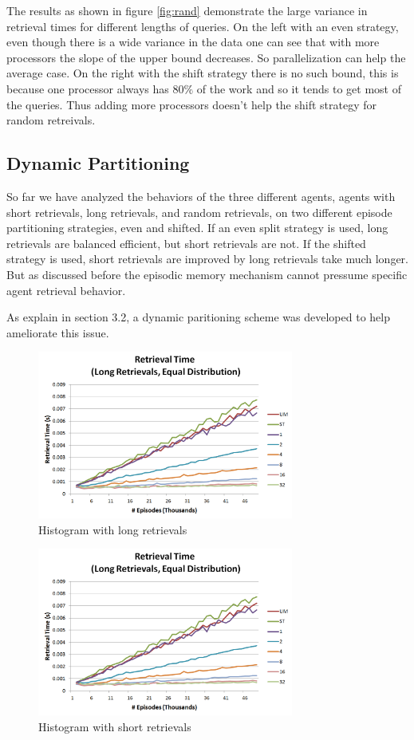 \documentclass[11pt]{article} %
\begin{document}
The results as shown in figure \ref{fig:rand} demonstrate the large variance in retrieval times for different lengths of queries.
On the left with an even strategy, even though there is a wide variance in the data one can see that with more processors the slope of the upper bound
decreases. So parallelization can help the average case. On the right with the shift strategy there is no such bound, 
this is because one processor always has $80\%$ of the work and so it tends to get most of the queries. Thus
adding more processors doesn't help the shift strategy for random retreivals. 



\subsection{Dynamic Partitioning}

So far we have analyzed the behaviors of the three different agents, agents with short retrievals, long retrievals, and random retrievals, on two different episode partitioning strategies, even and shifted.  If an even split strategy is used, long retrievals are balanced efficient, but short retrievals are not.  If the shifted strategy is used, short retrievals are improved by long retrievals take much longer. But as discussed before the episodic memory mechanism cannot pressume specific agent retrieval behavior.

As explain in section 3.2, a dynamic paritioning scheme was developed to help ameliorate this issue.
\begin{figure}[h]
\caption{Histogram with long retrievals}
\centering
\includegraphics[width=0.75\textwidth]{images/ret_worst_eq}
\end{figure}

\begin{figure}[h]
\caption{Histogram with short retrievals}
\centering
\includegraphics[width=0.75\textwidth]{images/ret_worst_eq}
\end{figure}
\end{document}
